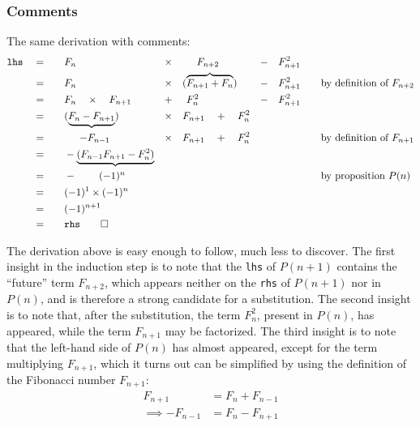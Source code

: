 \documentclass[12pt]{article}
\begin{document}
\subsubsection*{Comments}
The same derivation with comments:
\begin{alignat*}{7}
\texttt{lhs} \quad
 &=& \quad & F_{n} \quad &\times& \quad \makebox[5em]{$F_{n+2}$} \quad&-\quad F_{n+1}^{2} & \\
 &=& \quad & F_{n} \quad &\times& \quad (\overbrace{F_{n+1}+F_{n}}) \quad&-\quad F_{n+1}^{2} 
 & \qquad\text{by definition of $F_{n+2}$} \\
 &=& \quad & F_{n} \quad \times \quad F_{n+1} \quad&+&\quad \makebox[2em]{$F_{n}^{2}$} \quad &-\quad F_{n+1}^{2} \\
 &=& \quad & (\underbrace{F_{n}-F_{n+1}}) \quad &\times& \quad  F_{n+1} \quad+\quad F_{n}^{2} \\
 &=& \quad & \makebox[6em]{$-F_{n-1}$} \quad &\times& \quad F_{n+1} \quad+\quad F_{n}^{2} &
 & \qquad\text{by definition of $F_{n+1}$} \\
 &=& \quad & - \underbrace{(F_{n-1}F_{n+1} - F_{n}^{2})} & \\ 
 &=& \quad & - \makebox[7em]{$(-1)^{n}$} &&&
 & \qquad\text{by proposition $P(n)$} \\
 &=& \quad & (-1)^{1}\times(-1)^{n} \\
 &=& \quad & (-1)^{n+1} \\
 &=& \quad & \texttt{rhs} \qed 
\end{alignat*}

The derivation above is easy enough to follow, much less to discover. The first insight in the induction step is to note that the \texttt{lhs} of $P(n+1)$ contains the ``future'' term $F_{n+2}$, which appears neither on the \texttt{rhs} of $P(n+1)$ nor in $P(n)$, and is therefore a strong candidate for a substitution. The second insight is to note that, after the substitution, the term $F_{n}^{2}$, present in $P(n)$, has appeared, while the term $F_{n+1}$ may be factorized. The third insight is to note that the left-hand side of $P(n)$ has almost appeared, except for the term multiplying $F_{n+1}$, which it turns out can be simplified by using the definition of the Fibonacci number $F_{n+1}$: 
\begin{align*}
F_{n+1} & = F_{n} + F_{n-1} \\
\implies 
-F_{n-1} & = F_{n} - F_{n+1}
\end{align*}
\end{document}
